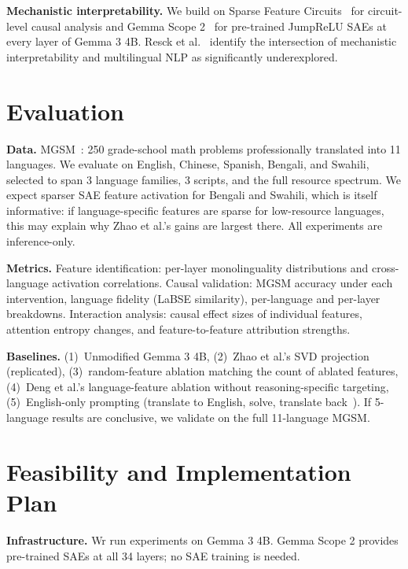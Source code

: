 \documentclass[10pt,twocolumn,a4paper]{article}
\begin{document}
\textbf{Mechanistic interpretability.} We build on Sparse Feature Circuits~\cite{marks} for circuit-level causal analysis and Gemma Scope 2~\cite{gemmascope} for pre-trained JumpReLU SAEs at every layer of Gemma 3 4B. Resck et al.~\cite{resck} identify the intersection of mechanistic interpretability and multilingual NLP as significantly underexplored.

\section{Evaluation}

\textbf{Data.} MGSM~\cite{mgsm}: 250 grade-school math problems professionally translated into 11 languages. We evaluate on English, Chinese, Spanish, Bengali, and Swahili, selected to span 3 language families, 3 scripts, and the full resource spectrum. We expect sparser SAE feature activation for Bengali and Swahili, which is itself informative: if language-specific features are sparse for low-resource languages, this may explain why Zhao et al.'s gains are largest there. All experiments are inference-only.

\textbf{Metrics.} Feature identification: per-layer monolinguality distributions and cross-language activation correlations. Causal validation: MGSM accuracy under each intervention, language fidelity (LaBSE similarity), per-language and per-layer breakdowns. Interaction analysis: causal effect sizes of individual features, attention entropy changes, and feature-to-feature attribution strengths.

\textbf{Baselines.} (1)~Unmodified Gemma 3 4B, (2)~Zhao et al.'s SVD projection (replicated), (3)~random-feature ablation matching the count of ablated features, (4)~Deng et al.'s language-feature ablation without reasoning-specific targeting, (5)~English-only prompting (translate to English, solve, translate back~\cite{etxaniz}). If 5-language results are conclusive, we validate on the full 11-language MGSM.

\section{Feasibility and Implementation Plan}

\textbf{Infrastructure.} Wr run experiments on Gemma 3 4B. Gemma Scope 2 provides pre-trained SAEs at all 34 layers; no SAE training is needed.


\end{document}
